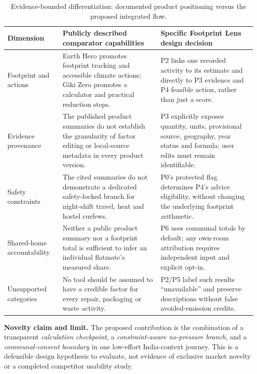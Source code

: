 \documentclass[12pt,a4paper]{article}
\begin{document}
\begin{table}[ht]
\centering\small
\caption{Evidence-bounded differentiation: documented product positioning versus the proposed integrated flow.}
\label{tab:competitor}
\begin{tabularx}{\textwidth}{@{}p{2.75cm}XX@{}}
\toprule
\textbf{Dimension}&\textbf{Publicly described comparator capabilities}&\textbf{Specific Footprint Lens design decision}\\
\midrule
Footprint and actions&Earth Hero promotes footprint tracking and accessible climate actions; Giki Zero promotes a calculator and practical reduction steps.&P2 links one recorded activity to its estimate and directly to P3 evidence and P4 feasible action, rather than just a score.\\
\rowcolor{RowGray}
Evidence provenance&The published product summaries do not establish the granularity of factor editing or local-source metadata in every product version.&P3 explicitly exposes quantity, units, provisional source, geography, year status and formula; user edits must remain identifiable.\\
Safety constraints&The cited summaries do not demonstrate a dedicated safety-locked branch for night-shift travel, heat and hostel curfews.&P0's protected flag determines P4's advice eligibility, without changing the underlying footprint arithmetic.\\
\rowcolor{RowGray}
Shared-home accountability&Neither a public product summary nor a footprint total is sufficient to infer an individual flatmate's measured share.&P6 uses communal totals by default; any own-room attribution requires independent input and explicit opt-in.\\
Unsupported categories&No tool should be assumed to have a credible factor for every repair, packaging or waste activity.&P2/P5 label such results ``unavailable'' and preserve descriptions without false avoided-emission credits.\\
\bottomrule
\end{tabularx}
\end{table}

\textbf{Novelty claim and limit.} The proposed contribution is the combination of a transparent \emph{calculation checkpoint}, a \emph{constraint-aware no-pressure branch}, and a \emph{communal-consent boundary} in one low-effort India-context journey. This is a defensible design hypothesis to evaluate, not evidence of exclusive market novelty or a completed competitor usability study.
\end{document}
